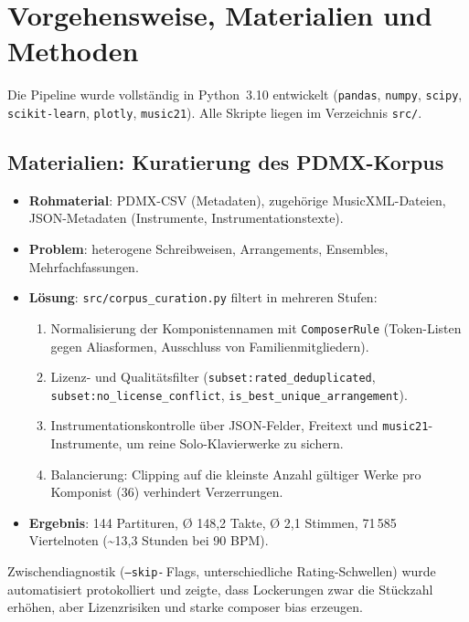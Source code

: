 \documentclass[12pt,a4paper]{article}
\theoremstyle{definition}
\begin{document}
\section{Vorgehensweise, Materialien und Methoden}
Die Pipeline wurde vollständig in Python~3.10 entwickelt (\texttt{pandas}, \texttt{numpy}, \texttt{scipy}, \texttt{scikit-learn}, \texttt{plotly}, \texttt{music21}). Alle Skripte liegen im Verzeichnis \texttt{src/}.

\subsection{Materialien: Kuratierung des PDMX-Korpus}
\begin{itemize}
    \item \textbf{Rohmaterial}: PDMX-CSV (Metadaten), zugehörige MusicXML-Dateien, JSON-Metadaten (Instrumente, Instrumentationstexte).
    \item \textbf{Problem}: heterogene Schreibweisen, Arrangements, Ensembles, Mehrfachfassungen.
    \item \textbf{Lösung}: \texttt{src/corpus\_curation.py} filtert in mehreren Stufen:
    \begin{enumerate}
        \item Normalisierung der Komponistennamen mit \texttt{ComposerRule} (Token-Listen gegen Aliasformen, Ausschluss von Familienmitgliedern).
        \item Lizenz- und Qualitätsfilter (\texttt{subset:rated\_deduplicated}, \texttt{subset:no\_license\_conflict}, \texttt{is\_best\_unique\_arrangement}).
        \item Instrumentationskontrolle über JSON-Felder, Freitext und \texttt{music21}-Instrumente, um reine Solo-Klavierwerke zu sichern.
        \item Balancierung: Clipping auf die kleinste Anzahl gültiger Werke pro Komponist (36) verhindert Verzerrungen.
    
    \end{enumerate}
    \item \textbf{Ergebnis}: 144 Partituren, Ø 148{,}2 Takte, Ø 2,1 Stimmen, 71\,585 Viertelnoten (\textasciitilde13,3 Stunden bei 90 BPM).
\end{itemize}

Zwischendiagnostik (\texttt{--skip-}\,Flags, unterschiedliche Rating-Schwellen) wurde automatisiert protokolliert und zeigte, dass Lockerungen zwar die Stückzahl erhöhen, aber Lizenzrisiken und starke composer bias erzeugen.
\end{document}
